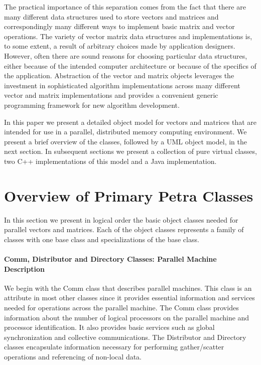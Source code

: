 \documentclass[12pt,relax]{PetraObjectModel}
\begin{document}
The practical importance of this separation comes from the fact 
that there are many different data structures used to store 
vectors and matrices and correspondingly many different ways 
to implement basic matrix and vector operations.  The variety 
of vector matrix data structures and implementations is, to 
some extent, a result of arbitrary choices made by application 
designers.  However, often there are sound reasons for choosing 
particular data structures, either because of the intended 
computer architecture or because of the specifics of the 
application.  Abstraction of the vector and matrix objects 
leverages the investment in sophisticated algorithm implementations 
across many different vector and matrix implementations and 
provides a convenient generic programming framework for new 
algorithm development.

In this paper we present a detailed object model for vectors 
and matrices that are intended for use in a parallel, distributed 
memory computing environment.  We present a brief overview of 
the classes, followed by a UML object model, in the next section.
In subsequent sections we present a collection of pure virtual
classes, two C++ implementations of this model and a Java
implementation.


\section{Overview of Primary Petra Classes}

In this section we present in logical order the basic object classes 
needed for parallel vectors and matrices.  Each of the object
classes represents a family of classes with one base class and 
specializations of the base class.

\paragraph{Comm, Distributor and Directory Classes:  Parallel Machine
 Description}

We begin with the Comm class that describes parallel machines.  
This class is an attribute in most other classes since it provides 
essential information and services needed for operations across the 
parallel machine.  The Comm class provides information about the number 
of  logical processors on the parallel machine and processor identification.
It also provides basic services such as global synchronization and collective 
communications. The Distributor and Directory classes encapsulate information
necessary for performing gather/scatter operations and referencing of non-local
data.
\end{document}
